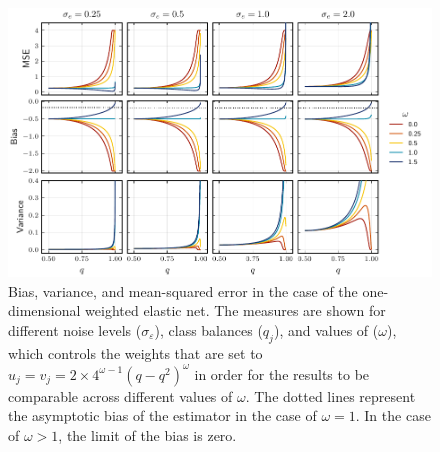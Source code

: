 \begin{figure}[htpb]
  \centering
  \includegraphics[]{plots/binary_onedim_bias_var_elnet.pdf}
  \caption{%
    Bias, variance, and mean-squared error in the case of the one-dimensional weighted elastic
    net. The measures are shown for different noise levels (\(\sigma_\varepsilon\)), class
    balances (\(q_j\)), and values of (\(\omega\)), which controls the weights that are set to
    \(u_j = v_j = 2\times 4^{\omega - 1}(q-q^2)^\omega\) in order for the results to be
    comparable across different values of \(\omega\). The dotted lines represent the asymptotic
    bias of the estimator in the case of \(\omega = 1\). In the case of \(\omega > 1\), the
    limit of the bias is zero. \label{fig:binary-onedim-bias-var-elnet}
  }
\end{figure}
